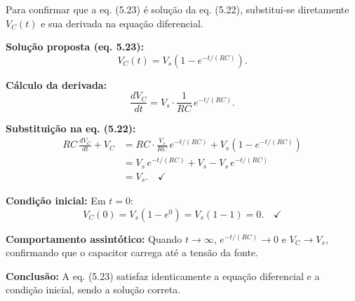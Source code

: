 Para confirmar que a eq. (5.23) é solução da eq. (5.22), substitui-se diretamente $V_C(t)$ e sua derivada na equação diferencial.

\textbf{Solução proposta (eq. 5.23):}
\[
V_C(t) = V_s\left(1 - e^{-t/(RC)}\right).
\]

\textbf{Cálculo da derivada:}
\[
\frac{dV_C}{dt} = V_s\cdot\frac{1}{RC}\,e^{-t/(RC)}.
\]

\textbf{Substituição na eq. (5.22):}
\begin{align*}
RC\,\frac{dV_C}{dt} + V_C
&= RC\cdot\frac{V_s}{RC}\,e^{-t/(RC)} + V_s\left(1 - e^{-t/(RC)}\right) \\
&= V_s\,e^{-t/(RC)} + V_s - V_s\,e^{-t/(RC)} \\
&= V_s.\quad\checkmark
\end{align*}

\textbf{Condição inicial:} Em $t=0$:
\[
V_C(0) = V_s\left(1 - e^0\right) = V_s(1-1) = 0.\quad\checkmark
\]

\textbf{Comportamento assintótico:} Quando $t \to \infty$, $e^{-t/(RC)} \to 0$ e $V_C \to V_s$, confirmando que o capacitor carrega até a tensão da fonte.

\textbf{Conclusão:} A eq. (5.23) satisfaz identicamente a equação diferencial e a condição inicial, sendo a solução correta. 